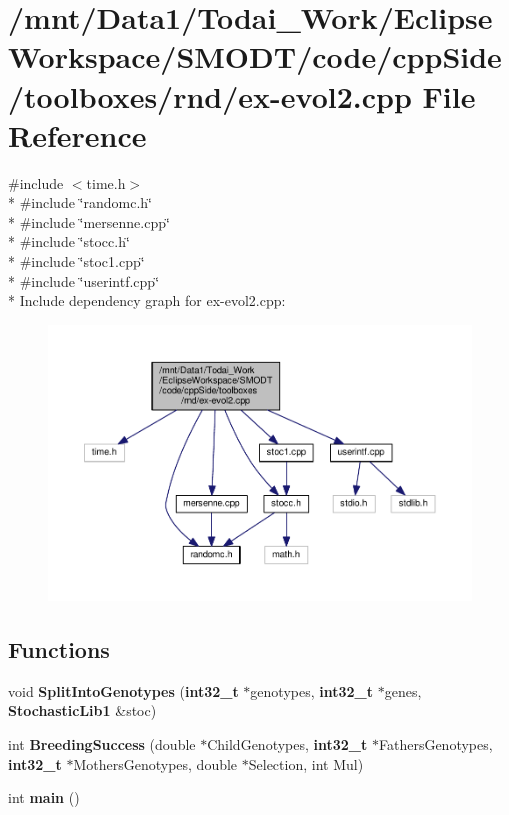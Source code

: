 \section{/mnt/\-Data1/\-Todai\-\_\-\-Work/\-Eclipse\-Workspace/\-S\-M\-O\-D\-T/code/cpp\-Side/toolboxes/rnd/ex-\/evol2.cpp File Reference}
\label{toolboxes_2rnd_2ex-evol2_8cpp}
{\ttfamily \#include $<$time.\-h$>$}\\*
{\ttfamily \#include \char`\"{}randomc.\-h\char`\"{}}\\*
{\ttfamily \#include \char`\"{}mersenne.\-cpp\char`\"{}}\\*
{\ttfamily \#include \char`\"{}stocc.\-h\char`\"{}}\\*
{\ttfamily \#include \char`\"{}stoc1.\-cpp\char`\"{}}\\*
{\ttfamily \#include \char`\"{}userintf.\-cpp\char`\"{}}\\*
Include dependency graph for ex-\/evol2.cpp\-:
\nopagebreak
\begin{figure}[H]
\begin{center}
\leavevmode
\includegraphics[width=350pt]{toolboxes_2rnd_2ex-evol2_8cpp__incl}
\end{center}
\end{figure}
\subsection*{Functions}
\begin{DoxyCompactItemize}
\item 
void {\bf Split\-Into\-Genotypes} ({\bf int32\-\_\-t} $\ast$genotypes, {\bf int32\-\_\-t} $\ast$genes, {\bf Stochastic\-Lib1} \&stoc)
\item 
int {\bf Breeding\-Success} (double $\ast$Child\-Genotypes, {\bf int32\-\_\-t} $\ast$Fathers\-Genotypes, {\bf int32\-\_\-t} $\ast$Mothers\-Genotypes, double $\ast$Selection, int Mul)
\item 
int {\bf main} ()
\end{DoxyCompactItemize}


